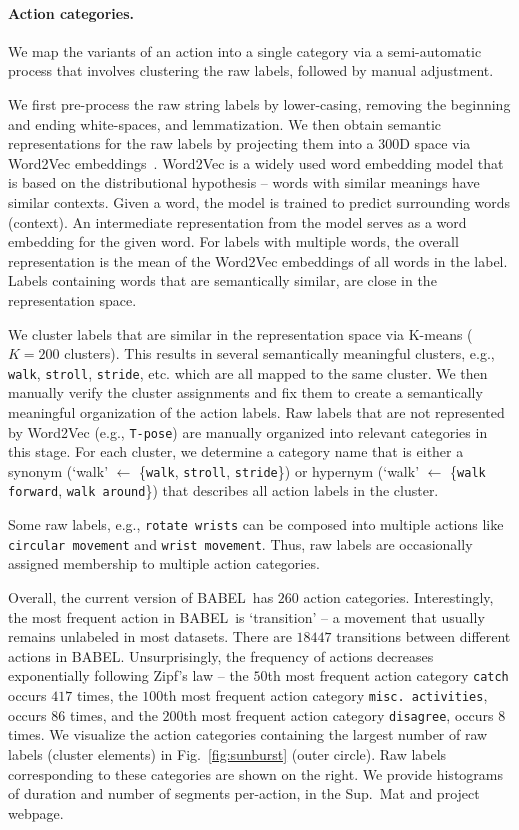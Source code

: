 \documentclass[final]{cvpr}
\def\babel{BABEL}
\begin{document}
\noindent
\paragraph{Action categories.} 
We map the variants of an action into a single category via a semi-automatic process that involves clustering the raw labels, followed by manual adjustment. 

We first pre-process the raw string labels by lower-casing, removing the beginning and ending white-spaces, and lemmatization. 
We then obtain semantic representations for the raw labels by projecting them into a 300D space via Word2Vec embeddings~\cite{w2vec}. 
Word2Vec is a widely used word embedding model that is based on the distributional hypothesis -- words with similar meanings have similar contexts. Given a word, the model is trained to predict surrounding words (context). An intermediate representation from the model serves as a word embedding for the given word. 
For labels with multiple words, the overall representation is the mean of the Word2Vec embeddings of all words in the label. Labels containing words that are semantically similar, are close in the representation space. 

We cluster labels that are similar in the representation space via K-means ($K=200$ clusters). 
This results in several semantically meaningful clusters, e.g., \texttt{walk}, \texttt{stroll}, \texttt{stride}, etc. which are all mapped to the same cluster. 
We then manually verify the cluster assignments and fix them to create a semantically meaningful organization of the action labels. 
Raw labels that are not represented by Word2Vec (e.g., \texttt{T-pose}) are manually organized into relevant categories in this stage. 
For each cluster, we determine a category name that is either a synonym (`walk' $\leftarrow$ \{\texttt{walk}, \texttt{stroll}, \texttt{stride}\}) or hypernym (`walk' $\leftarrow$ \{\texttt{walk forward}, \texttt{walk around}\}) that describes all action labels in the cluster. 

Some raw labels, e.g., \texttt{rotate wrists} can be composed into multiple actions like \texttt{circular movement} and \texttt{wrist movement}. 
Thus, raw labels are occasionally assigned membership to multiple action categories. 

Overall, the current version of \babel~has $260$ action categories. 
Interestingly, the most frequent action in \babel~is `transition' -- a movement that usually remains unlabeled in most datasets. There are $18447$ transitions between different actions in \babel. 
Unsurprisingly, the frequency of actions decreases exponentially following Zipf's law -- the $50$th most frequent action category \texttt{catch} occurs $417$ times, the $100$th most frequent action category \texttt{misc. activities}, occurs $86$ times, and the $200$th most frequent action category \texttt{disagree}, occurs $8$ times. 
We visualize the action categories containing the largest number of raw labels (cluster elements) in Fig.~\ref{fig:sunburst} (outer circle). 
Raw labels corresponding to these categories are shown on the right. 
We provide histograms of duration and number of segments per-action, in the Sup.~Mat and project webpage. 
\end{document}
